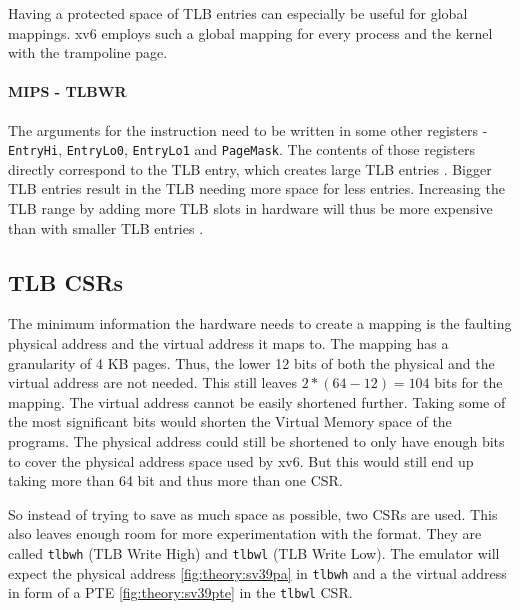 Having a protected space of TLB entries can especially be useful for global mappings. xv6 employs such a global
mapping for every process and the kernel with the trampoline page.

\paragraph{MIPS - TLBWR} The arguments for the instruction need to be written in some
other registers - \texttt{EntryHi}, \texttt{EntryLo0}, \texttt{EntryLo1} and \texttt{PageMask}.
The contents of those registers directly correspond to the TLB entry, which creates large
TLB entries \cite{heiserAnatomyHighPerformanceMicrokernel}. Bigger TLB entries result in the TLB needing more space for less entries. Increasing the TLB range by adding more TLB slots in hardware will thus be more expensive than with smaller TLB entries \cite{hennessy2017computer}.



\subsection{TLB CSRs}
The minimum information the hardware needs to create a mapping is the faulting physical address and
the virtual address it maps to.
The mapping has a granularity of 4 KB pages. Thus, the lower 12 bits of both the physical and the
virtual address are not needed.
This still leaves $2*(64-12)=104$ bits for the mapping.
The virtual address cannot be easily shortened further. Taking some of the most significant bits
would shorten the Virtual Memory space of the programs.
The physical address could still be shortened to only have enough bits to cover the physical address
space used by xv6.
But this would still end up taking more than 64 bit and thus more than one CSR.

So instead of trying to save as much space as possible, two CSRs are used.
This also leaves enough room for more experimentation with the format.
They are called \texttt{tlbwh} (TLB Write High) and \texttt{tlbwl} (TLB Write Low).
The emulator will expect the physical address \ref{fig:theory:sv39pa} in \texttt{tlbwh} and a the virtual address in form
of a PTE \ref{fig:theory:sv39pte} in the \texttt{tlbwl} CSR.



